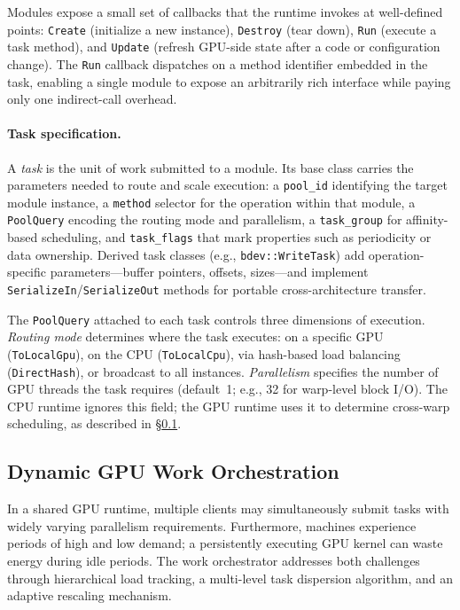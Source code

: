 Modules expose a small set of callbacks that the runtime invokes at
well-defined points: \texttt{Create} (initialize a new instance),
\texttt{Destroy} (tear down), \texttt{Run} (execute a task method),
and \texttt{Update} (refresh GPU-side state after a code or
configuration change).  The \texttt{Run} callback dispatches on a
method identifier embedded in the task, enabling a single module to
expose an arbitrarily rich interface while paying only one
indirect-call overhead.

\paragraph{Task specification.}
A \emph{task} is the unit of work submitted to a module.
Its base class carries the parameters needed to route and scale
execution:
a \texttt{pool\_id} identifying the target module instance,
a \texttt{method} selector for the operation within that module,
a \texttt{PoolQuery} encoding the routing mode and parallelism,
a \texttt{task\_group} for affinity-based scheduling, and
\texttt{task\_flags} that mark properties such as periodicity or
data ownership.
Derived task classes (e.g., \texttt{bdev::WriteTask}) add
operation-specific parameters---buffer pointers, offsets,
sizes---and implement \texttt{SerializeIn}/\texttt{SerializeOut}
methods for portable cross-architecture transfer.

The \texttt{PoolQuery} attached to each task controls three
dimensions of execution.
\emph{Routing mode} determines where the task executes: on a
specific GPU (\texttt{ToLocalGpu}), on the CPU
(\texttt{ToLocalCpu}), via hash-based load balancing
(\texttt{DirectHash}), or broadcast to all instances.
\emph{Parallelism} specifies the number of GPU threads the task
requires (default~1; e.g., 32 for warp-level block I/O).
The CPU runtime ignores this field; the GPU runtime uses it to
determine cross-warp scheduling, as described in
\S\ref{sec:orchestrator}.

\subsection{Dynamic GPU Work Orchestration}
\label{sec:orchestrator}

In a shared GPU runtime, multiple clients may simultaneously submit
tasks with widely varying parallelism requirements.  Furthermore,
machines experience periods of high and low demand; a persistently
executing GPU kernel can waste energy during idle periods.
The work orchestrator addresses both challenges through hierarchical
load tracking, a multi-level task dispersion algorithm, and an
adaptive rescaling mechanism.

